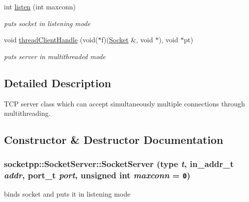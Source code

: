 \begin{CompactItemize}
int \hyperlink{classsocketpp_1_1SocketServer_034ddc2def5342b5a26264ffcb9e8e36}{listen} (int maxconn)
\begin{CompactList}\small\item\em puts socket in listening mode \item\end{CompactList}\item 
void \hyperlink{classsocketpp_1_1SocketServer_0ded92a6348a6cf953d9f646fac43ac2}{threadClientHandle} (void($\ast$f)(\hyperlink{classsocketpp_1_1Socket}{Socket} \&, void $\ast$), void $\ast$pt)
\begin{CompactList}\small\item\em puts server in multithreaded mode \item\end{CompactList}\end{CompactItemize}


\subsection{Detailed Description}
TCP server class which can accept simultaneously multiple connections through multithreading. 

\subsection{Constructor \& Destructor Documentation}
\hypertarget{classsocketpp_1_1SocketServer_73c5125f9e5a6cf03dc15f6d4250e345}{
\subsubsection{\setlength{\rightskip}{0pt plus 5cm}socketpp::SocketServer::SocketServer (type {\em t}, \/  in\_\-addr\_\-t {\em addr}, \/  port\_\-t {\em port}, \/  unsigned int {\em maxconn} = {\tt 0})}}
\label{classsocketpp_1_1SocketServer_73c5125f9e5a6cf03dc15f6d4250e345}


binds socket and puts it in listening mode 

